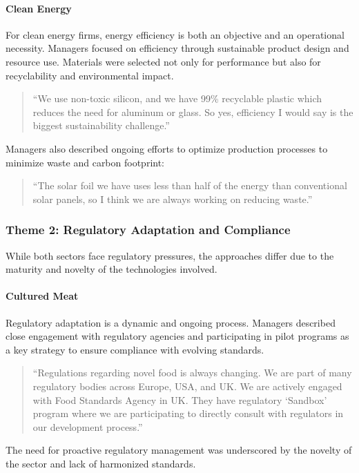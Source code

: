 \paragraph{Clean Energy}
For clean energy firms, energy efficiency is both an objective and an operational necessity. Managers focused on efficiency through sustainable product design and resource use. Materials were selected not only for performance but also for recyclability and environmental impact.
\begin{quote}
	“We use non-toxic silicon, and we have 99\% recyclable plastic which reduces the need for aluminum or glass. So yes, efficiency I would say is the biggest sustainability challenge.”
\end{quote}
Managers also described ongoing efforts to optimize production processes to minimize waste and carbon footprint:
\begin{quote}
	“The solar foil we have uses less than half of the energy than conventional solar panels, so I think we are always working on reducing waste.”
\end{quote}

\subsubsection*{Theme 2: Regulatory Adaptation and Compliance}
While both sectors face regulatory pressures, the approaches differ due to the maturity and novelty of the technologies involved.

\paragraph{Cultured Meat}
Regulatory adaptation is a dynamic and ongoing process. Managers described close engagement with regulatory agencies and participating in pilot programs as a key strategy to ensure compliance with evolving standards.
\begin{quote}
	“Regulations regarding novel food is always changing. We are part of many regulatory bodies across Europe, USA, and UK. We are actively engaged with Food Standards Agency in UK. They have regulatory ‘Sandbox’ program where we are participating to directly consult with regulators in our development process.”
\end{quote}
The need for proactive regulatory management was underscored by the novelty of the sector and lack of harmonized standards.

